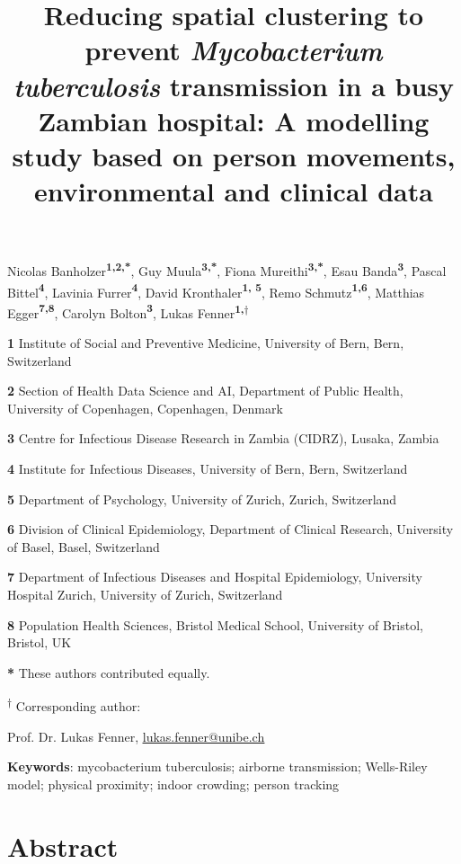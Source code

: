 \documentclass[11pt]{article}
\title{\phantomsection\label{_5drfaezi3ao9}{}\textbf{Reducing spatial clustering to prevent \emph{Mycobacterium tuberculosis} transmission in a busy Zambian hospital: A modelling study based on person movements, environmental and clinical data}}
\author{}
\date{}
\begin{document}
\maketitle

Nicolas Banholzer\textbf{\textsuperscript{1,2,*}}, Guy Muula\textbf{\textsuperscript{3,*}}, Fiona Mureithi\textbf{\textsuperscript{3,*}}, Esau Banda\textbf{\textsuperscript{3}}, Pascal Bittel\textbf{\textsuperscript{4}}, Lavinia Furrer\textbf{\textsuperscript{4}}, David Kronthaler\textbf{\textsuperscript{1, 5}}, Remo Schmutz\textbf{\textsuperscript{1,6}}, Matthias Egger\textbf{\textsuperscript{7,8}}, Carolyn Bolton\textbf{\textsuperscript{3}}, Lukas Fenner\textbf{\textsuperscript{1,$\dagger$}}

\textbf{1} Institute of Social and Preventive Medicine, University of Bern, Bern, Switzerland

\textbf{2} Section of Health Data Science and AI, Department of Public Health, University of Copenhagen, Copenhagen, Denmark

\textbf{3} Centre for Infectious Disease Research in Zambia (CIDRZ), Lusaka, Zambia

\textbf{4} Institute for Infectious Diseases, University of Bern, Bern, Switzerland

\textbf{5} Department of Psychology, University of Zurich, Zurich, Switzerland

\textbf{6} Division of Clinical Epidemiology, Department of Clinical Research, University of Basel, Basel, Switzerland

\textbf{7} Department of Infectious Diseases and Hospital Epidemiology, University Hospital Zurich, University of Zurich, Switzerland

\textbf{8} Population Health Sciences, Bristol Medical School, University of Bristol, Bristol, UK

\textbf{*} These authors contributed equally.

\textsuperscript{$\dagger$} Corresponding author:

Prof. Dr. Lukas Fenner, \href{mailto:lukas.fenner@unibe.ch}{\ul{lukas.fenner@unibe.ch}}

\textbf{Keywords}: mycobacterium tuberculosis; airborne transmission; Wells-Riley model; physical proximity; indoor crowding; person tracking

\section{Abstract}\label{abstract}
\end{document}
